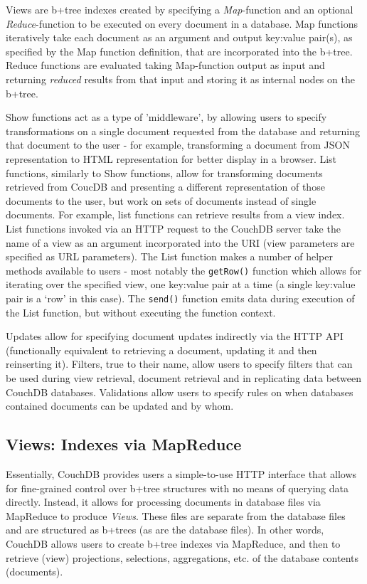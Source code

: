 Views are b+tree indexes created by specifying a \textit{Map}-function and an optional \textit{Reduce}-function to be executed on every document in a database. Map functions iteratively take each document as an argument and output key:value pair(s), as specified by the Map function definition, that are incorporated into the b+tree. Reduce functions are evaluated taking Map-function output as input and returning \textit{reduced} results from that input and storing it as internal nodes on the b+tree.

Show functions act as a type of 'middleware', by allowing users to specify transformations on a single document requested from the database and returning that document to the user - for example, transforming a document from JSON representation to HTML representation for better display in a browser. List functions, similarly to Show functions, allow for transforming documents retrieved from CoucDB and presenting a different representation of those documents to the user, but work on sets of documents instead of single documents. For example, list functions can retrieve results from a view index. List functions invoked via an HTTP request to the CouchDB server take the name of a view as an argument incorporated into the URI (view parameters are specified as URL parameters). The List function makes a number of helper methods available to users - most notably the \texttt{getRow()} function which allows for iterating over the specified view, one key:value pair at a time (a single key:value pair is a `row' in this case). The \texttt{send()} function emits data during execution of the List function, but without executing the function context.

Updates allow for specifying document updates indirectly via the HTTP API (functionally equivalent to retrieving a document, updating it and then reinserting it). Filters, true to their name, allow users to specify filters that can be used during view retrieval, document retrieval and in replicating data between CouchDB databases. Validations allow users to specify rules on when databases contained documents can be updated and by whom.

\subsection{Views: Indexes via MapReduce}
Essentially, CouchDB provides users a simple-to-use HTTP interface that allows for fine-grained control over b+tree structures with no means of querying data directly. Instead, it allows for processing documents in database files via MapReduce to produce \textit{Views}. These files are separate from the database files and are structured as b+trees (as are the database files). In other words, CouchDB allows users to create b+tree indexes via MapReduce, and then to retrieve (view) projections, selections, aggregations, etc. of the database contents (documents).

